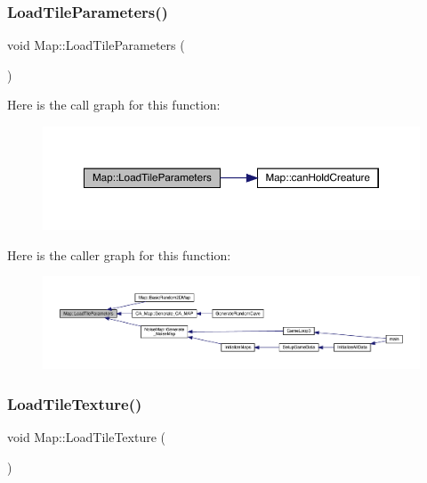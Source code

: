 \subsubsection{\texorpdfstring{Load\+Tile\+Parameters()}{LoadTileParameters()}}
{\footnotesize\ttfamily void Map\+::\+Load\+Tile\+Parameters (\begin{DoxyParamCaption}{ }\end{DoxyParamCaption})}

Here is the call graph for this function\+:
\nopagebreak
\begin{figure}[H]
\begin{center}
\leavevmode
\includegraphics[width=350pt]{dd/d11/class_map_a4e045e2e1df74c3fcba4b860f240d498_cgraph}
\end{center}
\end{figure}
Here is the caller graph for this function\+:
\nopagebreak
\begin{figure}[H]
\begin{center}
\leavevmode
\includegraphics[width=350pt]{dd/d11/class_map_a4e045e2e1df74c3fcba4b860f240d498_icgraph}
\end{center}
\end{figure}
\mbox{\label{class_map_ab64e7930cd811d847dbbee056b1e2fb0}} 
\subsubsection{\texorpdfstring{Load\+Tile\+Texture()}{LoadTileTexture()}}
{\footnotesize\ttfamily void Map\+::\+Load\+Tile\+Texture (\begin{DoxyParamCaption}{ }\end{DoxyParamCaption})}

